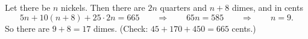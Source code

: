 Let there be $n$ nickels. Then there are $2n$ quarters and $n+8$ dimes, and in cents
\[5n+10(n+8)+25\cdot2n=665\qquad\Longrightarrow\qquad65n=585\qquad\Longrightarrow\qquad n=9.\]
So there are $9+8=\boxed{17}$ dimes. (Check: $45+170+450=665$ cents.)
